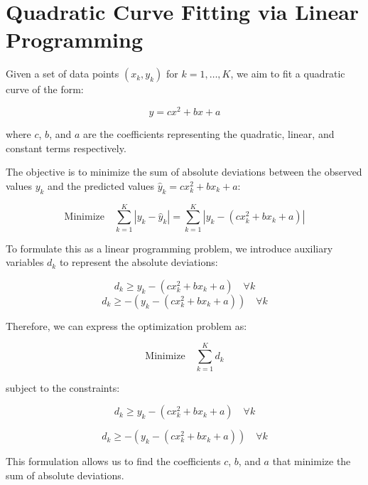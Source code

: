 \documentclass{article}
\begin{document}
\section*{Quadratic Curve Fitting via Linear Programming}

Given a set of data points $(x_k, y_k)$ for $k = 1, \ldots, K$, we aim to fit a quadratic curve of the form:

\[
y = c x^2 + b x + a
\]

where \( c \), \( b \), and \( a \) are the coefficients representing the quadratic, linear, and constant terms respectively.

The objective is to minimize the sum of absolute deviations between the observed values \( y_k \) and the predicted values \( \hat{y}_k = c x_k^2 + b x_k + a \):

\[
\text{Minimize} \quad \sum_{k=1}^{K} |y_k - \hat{y}_k| = \sum_{k=1}^{K} |y_k - (c x_k^2 + b x_k + a)|
\]

To formulate this as a linear programming problem, we introduce auxiliary variables \( d_k \) to represent the absolute deviations:

\[
d_k \geq y_k - (c x_k^2 + b x_k + a) \quad \forall k
\]
\[
d_k \geq -(y_k - (c x_k^2 + b x_k + a)) \quad \forall k
\]

Therefore, we can express the optimization problem as:

\[
\text{Minimize} \quad \sum_{k=1}^{K} d_k
\]

subject to the constraints:

\[
d_k \geq y_k - (c x_k^2 + b x_k + a) \quad \forall k
\]

\[
d_k \geq -(y_k - (c x_k^2 + b x_k + a)) \quad \forall k
\]

This formulation allows us to find the coefficients \( c \), \( b \), and \( a \) that minimize the sum of absolute deviations.
\end{document}

